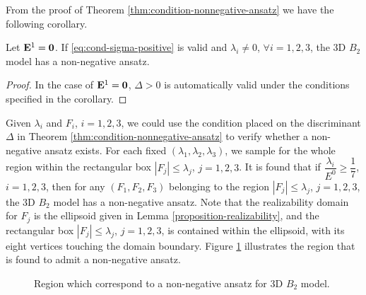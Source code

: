 From the proof of Theorem \ref{thm:condition-nonnegative-ansatz}
we have the following corollary.
\begin{corollary}
  Let $\mathbf{E}^1 = \boldsymbol{0}$.  If \eqref{eq:cond-sigma-positive} is
  valid and $\lambda_i \neq 0$, $\forall i = 1,2,3$, the 3D $B_2$
  model has a non-negative ansatz.
\end{corollary}
\begin{proof}
  In the case of $\mathbf{E}^1 = \boldsymbol{0}$, $\Delta > 0$ is automatically
  valid under the conditions specified in the corollary.
\end{proof}

Given $\lambda_i$ and $F_i$, $i=1,2,3$, we could use the 
condition placed on the discriminant $\Delta$ in Theorem 
\ref{thm:condition-nonnegative-ansatz} to verify whether 
a non-negative ansatz exists. For each fixed 
$(\lambda_1, \lambda_2, \lambda_3)$, we sample for  
the whole region within the rectangular box $|F_j| \leq \lambda_j$, 
$j = 1,2,3$. It is found that if 
$\dfrac{\lambda_i}{E^0}\geq\dfrac17$, $i = 1,2,3$, then for any
$(F_1, F_2, F_3)$ belonging to the region $|F_j| \leq \lambda_j$,
$j = 1,2,3$, the 3D $B_2$ model has a non-negative ansatz. Note
that the realizability domain for $F_j$ is the ellipsoid given in Lemma
\ref{proposition-realizability}, and the rectangular box $|F_j| \leq \lambda_j$,
$j = 1,2,3$, is contained within the ellipsoid, with its eight
vertices touching the domain boundary. 
Figure \ref{fig:realizable-region} illustrates the region that is found to
admit a non-negative ansatz.
\begin{figure}
  \hfill
  \hfill
  \caption{Region which correspond to a non-negative ansatz for 3D $B_2$ model.}
  \label{fig:realizable-region}
\end{figure}


